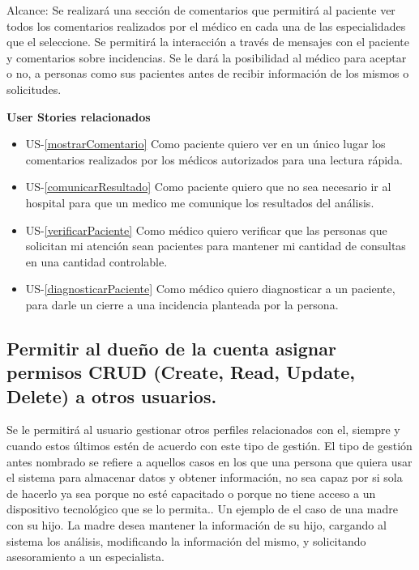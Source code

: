     Alcance: 
    Se realizará una sección de comentarios que permitirá al paciente ver todos los comentarios realizados por el médico en cada una de las especialidades que el seleccione.
    Se permitirá la interacción a través de mensajes con el paciente y comentarios sobre incidencias.
    Se le dará la posibilidad al médico para aceptar o no, a personas como sus pacientes antes de recibir información de los mismos o solicitudes.
    
        \textbf{User Stories relacionados}
        \begin{itemize}
			\item US-\ref{mostrarComentario} Como paciente quiero ver en un único lugar los comentarios realizados por los médicos autorizados para una lectura rápida.
            \item US-\ref{comunicarResultado} Como paciente quiero que no sea necesario ir al hospital para que un medico me comunique los resultados del análisis.
			\item US-\ref{verificarPaciente} Como médico quiero verificar que las personas que solicitan mi atención sean pacientes para mantener mi cantidad de consultas en una cantidad controlable.
			\item US-\ref{diagnosticarPaciente} Como médico quiero diagnosticar a un paciente, para darle un cierre a una incidencia planteada por la persona.
		\end{itemize}
        
        
\subsection{Permitir al dueño de la cuenta asignar permisos CRUD (Create, Read, Update, Delete) a otros usuarios.}

    Se le permitirá al usuario gestionar otros perfiles  relacionados con el, siempre y cuando estos últimos estén de acuerdo con este tipo de gestión.
    El tipo de gestión antes nombrado se refiere a aquellos casos en los que una persona que quiera usar el sistema para almacenar datos y obtener información, no sea capaz por si sola de hacerlo ya sea porque no esté capacitado o porque no tiene acceso a un dispositivo tecnológico que se lo permita..
    Un ejemplo de el caso de una madre con su hijo. La madre desea mantener la información de su hijo, cargando al sistema los análisis, modificando la información del mismo, y solicitando asesoramiento a un especialista.


